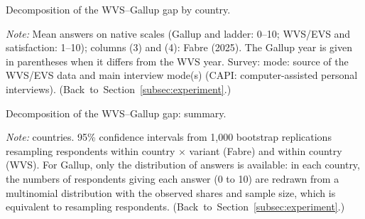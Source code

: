 \documentclass[12pt]{article}
\begin{document}
\begin{table}[htbp]
    \centering
    \caption{Decomposition of the WVS--Gallup gap by country.}\label{tab:decomposition_country}
    \begin{adjustbox}{max width=\textwidth}
    
    \end{adjustbox}
    \begin{minipage}{\textwidth}\footnotesize \textit{Note:} Mean answers on native scales (Gallup and ladder: 0--10; WVS/EVS and satisfaction: 1--10); columns (3) and (4): Fabre (2025). The Gallup year is given in parentheses when it differs from the WVS year. Survey: mode: source of the WVS/EVS data and main interview mode(s) (CAPI: computer-assisted personal interviews). \hfill(Back~to~Section~\ref{subsec:experiment}.)\end{minipage}
\end{table}

\begin{table}[htbp]
    \centering
    \caption{Decomposition of the WVS--Gallup gap: summary.}\label{tab:decomposition_summary}
    \begin{adjustbox}{max width=\textwidth}
    
    \end{adjustbox}
    \begin{minipage}{\textwidth}\footnotesize \textit{Note:} \nDecompCountries countries. 95\% confidence intervals from 1,000 bootstrap replications resampling respondents within country $\times$ variant (Fabre) and within country (WVS). For Gallup, only the distribution of answers is available: in each country, the numbers of respondents giving each answer (0 to 10) are redrawn from a multinomial distribution with the observed shares and sample size, which is equivalent to resampling respondents. \hfill(Back~to~Section~\ref{subsec:experiment}.)\end{minipage}
\end{table}
\end{document}
